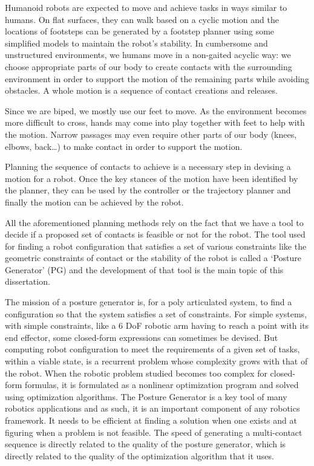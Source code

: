 Humanoid robots are expected to move and achieve tasks in ways similar to humans.
On flat surfaces, they can walk based on a cyclic motion and the locations of footsteps can be generated by a footstep planner using some simplified models to maintain the robot's stability.
In cumbersome and unstructured environments, we humans move in a non-gaited acyclic way: we choose appropriate parts of our body to create contacts with the surrounding environment in order to support the motion of the remaining parts while avoiding obstacles.
A whole motion is a sequence of contact creations and releases.

Since we are biped, we mostly use our feet to move.
As the environment becomes more difficult to cross, hands may come into play together with feet to help with the motion.
Narrow passages may even require other parts of our body (knees, elbows, back\dots) to make contact in order to support the motion.

Planning the sequence of contacts to achieve is a necessary step in devising a motion for a robot.
Once the key stances of the motion have been identified by the planner, they can be used by the controller or the trajectory planner and finally the motion can be achieved by the robot.

All the aforementioned planning methods rely on the fact that we have a tool to decide if a proposed set of contacts is feasible or not for the robot.
The tool used for finding a robot configuration that satisfies a set of various constraints like the geometric constraints of contact or the stability of the robot is called a `Posture Generator' (PG) and the development of that tool is the main topic of this dissertation.

The mission of a posture generator is, for a poly articulated system, to find a configuration so that the system satisfies a set of constraints.
For simple systems, with simple constraints, like a 6 DoF robotic arm having to reach a point with its end effector, some closed-form expressions can sometimes be devised.
But computing robot configuration to meet the requirements of a given set of tasks, within a viable state, is a recurrent problem whose complexity grows with that of the robot.
When the robotic problem studied becomes too complex for closed-form formulas, it is formulated as a nonlinear optimization program and solved using optimization algorithms.
The Posture Generator is a key tool of many robotics applications and as such, it is an important component of any robotics framework.
It needs to be efficient at finding a solution when one exists and at figuring when a problem is not feasible.
The speed of generating a multi-contact sequence is directly related to the quality of the posture generator, which is directly related to the quality of the optimization algorithm that it uses.

